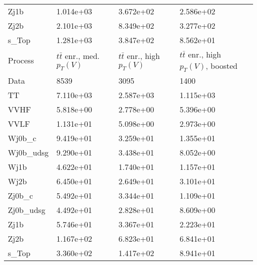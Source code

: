 \begin{table}
{\begin{tabularx}{0.8\textwidth}{|X|X|X|X|}
Zj1b & 1.014e+03 & 3.672e+02 & 2.586e+02 \\
Zj2b & 2.101e+03 & 8.349e+02 & 3.277e+02 \\
s\_Top & 1.281e+03 & 3.847e+02 & 8.562e+01 \\
\hline
\hline
Process & $t\bar{t}$ enr., med. $p_{T}(V)$ & $t\bar{t}$ enr., high $p_{T}(V)$ & $t\bar{t}$ enr., high $p_{T}(V)$, boosted \\
\hline
Data & 8539 & 3095 & 1400 \\
\hline
TT & 7.110e+03 & 2.587e+03 & 1.115e+03 \\
VVHF & 5.818e+00 & 2.778e+00 & 5.396e+00 \\
VVLF & 1.131e+01 & 5.098e+00 & 2.973e+00 \\
Wj0b\_c & 9.419e+01 & 3.259e+01 & 1.355e+01 \\
Wj0b\_udsg & 9.290e+01 & 3.438e+01 & 8.052e+00 \\
Wj1b & 4.622e+01 & 1.740e+01 & 1.157e+01 \\
Wj2b & 6.450e+01 & 2.649e+01 & 3.101e+01 \\
Zj0b\_c & 5.492e+01 & 3.344e+01 & 1.109e+01 \\
Zj0b\_udsg & 4.492e+01 & 2.828e+01 & 8.609e+00 \\
Zj1b & 5.746e+01 & 3.367e+01 & 2.223e+01 \\
Zj2b & 1.167e+02 & 6.823e+01 & 6.841e+01 \\
s\_Top & 3.360e+02 & 1.417e+02 & 8.941e+01 \\
\hline
\end{tabularx}
}
\label{tab:cr-Znn-2017}
\end{table}

